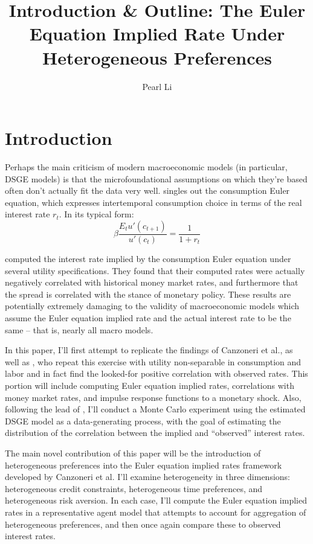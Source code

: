 \documentclass{hw}
\begin{document}
\title{Introduction \& Outline: The Euler Equation Implied Rate Under Heterogeneous Preferences}
\author{Pearl Li}
\maketitle

\section{Introduction}
Perhaps the main criticism of modern macroeconomic models (in particular, DSGE models) is that the microfoundational assumptions on which they're
based often don't actually fit the data very well. \cite{smith14} singles out the consumption Euler equation, which expresses intertemporal consumption choice in terms of the real interest rate $r_t$. In its typical form: $$\beta \frac{E_t u'(c_{t+1})}{u'(c_t)} = \frac{1}{1+r_t}$$

\cite{canzoneri07} computed the interest rate implied by the consumption Euler equation under several utility specifications. They found that their computed rates were actually negatively correlated with historical money market rates, and furthermore that the spread is correlated with the stance of monetary policy. These results are potentially extremely damaging to the validity of macroeconomic models which assume the Euler equation implied rate and the actual interest rate to be the same -- that is, nearly all macro models.

In this paper, I'll first attempt to replicate the findings of Canzoneri et al., as well as \cite{collard11}, who repeat this exercise with utility non-separable in consumption and labor and in fact find the looked-for positive correlation with observed rates. This portion will include computing Euler equation implied rates, correlations with money market rates, and impulse response functions to a monetary shock. Also, following the lead of \cite{gareis13}, I'll conduct a Monte Carlo experiment using the estimated \cite{smets07} DSGE model as a data-generating process, with the goal of estimating the distribution of the correlation between the implied and ``observed'' interest rates.

The main novel contribution of this paper will be the introduction of heterogeneous preferences into the Euler equation implied rates framework developed by Canzoneri et al. I'll examine heterogeneity in three dimensions: heterogeneous credit constraints, heterogeneous time preferences, and heterogeneous risk aversion. In each case, I'll compute the Euler equation implied rates in a representative agent model that attempts to account for aggregation of heterogeneous preferences, and then once again compare these to observed interest rates.
\end{document}
